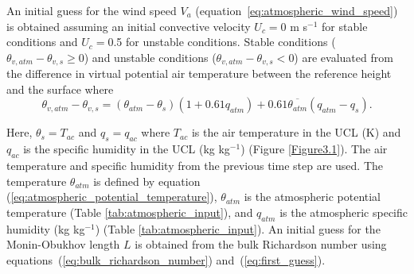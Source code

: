 \documentclass[12pt,authoryear]{elsarticle}
\numberwithin{equation}{section} %
\begin{document}
An initial guess for the wind speed $V_{a}$ (equation~\ref{eq:atmospheric_wind_speed}) is obtained assuming an initial convective velocity $U_{c}=0$ m s$^{-1}$ for stable conditions and $U_{c}=$0.5 for unstable conditions. Stable conditions ($\theta_{v,atm}-\theta_{v,s}\geq$0) and unstable conditions ($\theta_{v,atm}-\theta_{v,s}<$0) are evaluated from the difference in virtual potential air temperature between the reference height and the surface where
\begin{equation}
\theta_{v,atm}-\theta_{v,s}=(\theta_{atm}-\theta_{s})(1+0.61q_{atm})+0.61\overline{\theta_{atm}}(q_{atm}-q_{s}).
\end{equation}

Here, $\theta_{s}=T_{ac}$ and $q_{s}=q_{ac}$ where $T_{ac}$ is the air temperature in the UCL (K) and $q_{ac}$ is the specific humidity in the UCL (kg kg$^{-1}$) (Figure \ref{Figure3.1}). The air temperature and specific humidity from the previous time step are used. The temperature $\theta_{atm}$ is defined by equation (\ref{eq:atmospheric_potential_temperature}), $\theta_{atm}$ is the atmospheric potential temperature (Table \ref{tab:atmospheric_input}), and $q_{atm}$ is the atmospheric specific humidity (kg kg$^{-1}$) (Table \ref{tab:atmospheric_input}). An initial guess for the Monin-Obukhov length $L$ is obtained from the bulk Richardson number using equations~(\ref{eq:bulk_richardson_number}) and~(\ref{eq:first_guess}).
\end{document}
